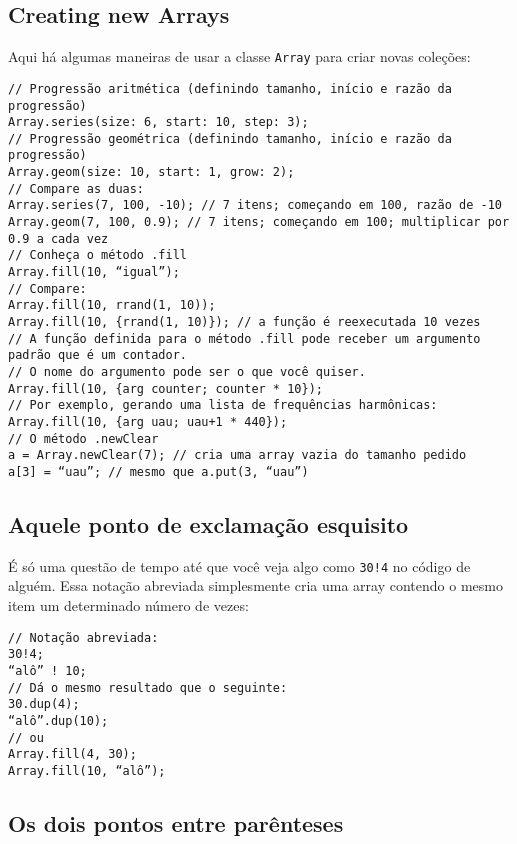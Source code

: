 \subsection{Creating new Arrays}

Aqui há algumas maneiras de usar a classe \texttt{Array} para criar novas coleções:

\begin{lstlisting}[style=SuperCollider-IDE, basicstyle=\scttfamily\footnotesize]
// Progressão aritmética (definindo tamanho, início e razão da progressão)
Array.series(size: 6, start: 10, step: 3);
// Progressão geométrica (definindo tamanho, início e razão da progressão)
Array.geom(size: 10, start: 1, grow: 2);
// Compare as duas:
Array.series(7, 100, -10); // 7 itens; começando em 100, razão de -10
Array.geom(7, 100, 0.9); // 7 itens; começando em 100; multiplicar por 0.9 a cada vez
// Conheça o método .fill
Array.fill(10, “igual”);
// Compare:
Array.fill(10, rrand(1, 10)); 
Array.fill(10, {rrand(1, 10)}); // a função é reexecutada 10 vezes
// A função definida para o método .fill pode receber um argumento padrão que é um contador.
// O nome do argumento pode ser o que você quiser.
Array.fill(10, {arg counter; counter * 10});
// Por exemplo, gerando uma lista de frequências harmônicas:
Array.fill(10, {arg uau; uau+1 * 440}); 
// O método .newClear
a = Array.newClear(7); // cria uma array vazia do tamanho pedido
a[3] = “uau”; // mesmo que a.put(3, “uau”)
\end{lstlisting}


\subsection{Aquele ponto de exclamação esquisito}

É só uma questão de tempo até que você veja algo como \texttt{30!4} no código de alguém. Essa notação abreviada simplesmente cria uma array contendo o mesmo item um determinado número de vezes:

 
\begin{lstlisting}[style=SuperCollider-IDE, basicstyle=\scttfamily\footnotesize]
// Notação abreviada:
30!4;
“alô” ! 10;
// Dá o mesmo resultado que o seguinte:
30.dup(4);
“alô”.dup(10);
// ou
Array.fill(4, 30);
Array.fill(10, “alô”);
\end{lstlisting}
 

\subsection{Os dois pontos entre parênteses}

